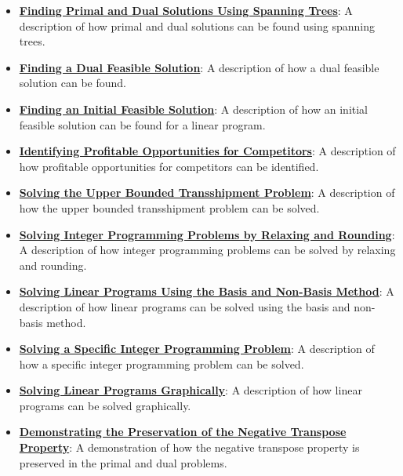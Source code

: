 \documentclass{article}%
\begin{document}
\begin{itemize}[leftmargin=*]
\item \href{https://www.math.purdue.edu/~yipn/421/2024-12-03-Duality.pdf#page=1}{\textbf{Finding Primal and Dual Solutions Using Spanning Trees}}: A description of how primal and dual solutions can be found using spanning trees. %
\item \href{https://www.math.purdue.edu/~yipn/421/2024-12-03-Duality.pdf#page=1}{\textbf{Finding a Dual Feasible Solution}}: A description of how a dual feasible solution can be found. %
\item \href{https://www.math.purdue.edu/~yipn/421/2024-12-03-Duality.pdf#page=1}{\textbf{Finding an Initial Feasible Solution}}: A description of how an initial feasible solution can be found for a linear program. %
\item \href{https://www.math.purdue.edu/~yipn/421/2024-12-03-Duality.pdf#page=1}{\textbf{Identifying Profitable Opportunities for Competitors}}: A description of how profitable opportunities for competitors can be identified. %
\item \href{https://www.math.purdue.edu/~yipn/421/2024-12-03-Duality.pdf#page=1}{\textbf{Solving the Upper Bounded Transshipment Problem}}: A description of how the upper bounded transshipment problem can be solved. %
\item \href{https://www.math.purdue.edu/~yipn/421/2024-12-03-Duality.pdf#page=1}{\textbf{Solving Integer Programming Problems by Relaxing and Rounding}}: A description of how integer programming problems can be solved by relaxing and rounding. %
\item \href{https://www.math.purdue.edu/~yipn/421/2024-12-03-Duality.pdf#page=1}{\textbf{Solving Linear Programs Using the Basis and Non{-}Basis Method}}: A description of how linear programs can be solved using the basis and non-basis method. %
\item \href{https://www.math.purdue.edu/~yipn/421/2024-12-03-Duality.pdf#page=1}{\textbf{Solving a Specific Integer Programming Problem}}: A description of how a specific integer programming problem can be solved. %
\item \href{https://www.math.purdue.edu/~yipn/421/2024-12-03-Duality.pdf#page=1}{\textbf{Solving Linear Programs Graphically}}: A description of how linear programs can be solved graphically. %
\item \href{https://www.math.purdue.edu/~yipn/421/2024-12-03-Duality.pdf#page=1}{\textbf{Demonstrating the Preservation of the Negative Transpose Property}}: A demonstration of how the negative transpose property is preserved in the primal and dual problems. %

\end{itemize}
\end{document}
